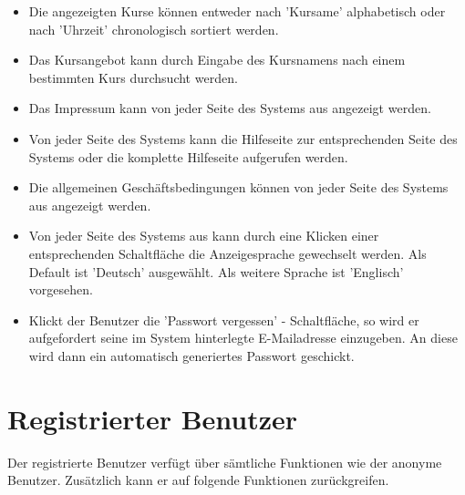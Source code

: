 \documentclass[a4paper]{scrreprt}
\newcounter{Lc}
\newcounter{Hc}
\newcommand{\stepHc}{\stepcounter{Hc}\setcounter{Lc}{0}}
\begin{document}
\begin{itemize}
	\item {}
	Die angezeigten Kurse können entweder nach 'Kursame' alphabetisch oder nach 'Uhrzeit' chronologisch sortiert werden.
	\item {}
	Das Kursangebot kann durch Eingabe des Kursnamens nach einem bestimmten Kurs durchsucht werden.
	\item {}
	Das Impressum kann von jeder Seite des Systems aus angezeigt werden.
	\item {}
	Von jeder Seite des Systems kann die Hilfeseite zur entsprechenden Seite des Systems oder die komplette Hilfeseite aufgerufen werden.
	\item {}
	Die allgemeinen Geschäftsbedingungen können von jeder Seite des Systems aus angezeigt werden.
	\item {}
	Von jeder Seite des Systems aus kann durch eine Klicken einer entsprechenden Schaltfläche die Anzeigesprache gewechselt werden. Als Default ist 'Deutsch' ausgewählt. Als weitere Sprache ist 'Englisch' vorgesehen. 
	\item {}
	Klickt der Benutzer die 'Passwort vergessen' - Schaltfläche, so wird er aufgefordert seine im System hinterlegte E-Mailadresse einzugeben. An diese wird dann ein automatisch generiertes Passwort geschickt.
\end{itemize}

\section{Registrierter Benutzer}
Der registrierte Benutzer verfügt über sämtliche Funktionen wie der anonyme Benutzer. Zusätzlich kann er auf folgende Funktionen zurückgreifen.
\stepHc
\end{document}
